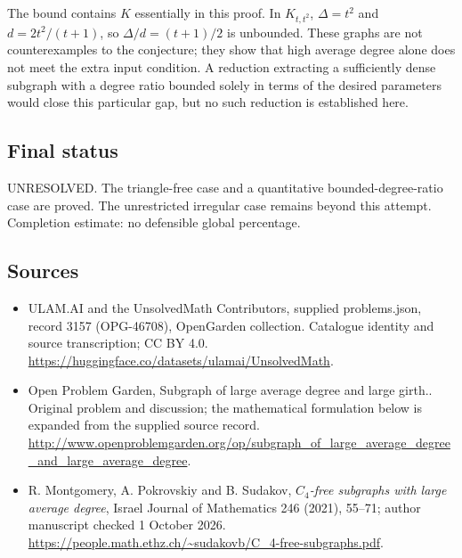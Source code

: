 \documentclass[11pt,a4paper]{article}
\begin{document}
The bound contains $K$ essentially in this proof. In $K_{t,t^2}$,
$\Delta=t^2$ and $d=2t^2/(t+1)$, so $\Delta/d=(t+1)/2$ is unbounded.
These graphs are not counterexamples to the conjecture; they show that
high average degree alone does not meet the extra input condition.
A reduction extracting a sufficiently dense subgraph with a degree
ratio bounded solely in terms of the desired parameters would close
this particular gap, but no such reduction is established here.

\subsection{Final status}
UNRESOLVED. The triangle-free case and a quantitative bounded-degree-ratio
case are proved. The unrestricted irregular case remains beyond this
attempt. Completion estimate: no defensible global percentage.

\subsection{Sources}
\begin{itemize}
\item[S1] ULAM.AI and the UnsolvedMath Contributors, supplied problems.json, record 3157 (OPG-46708), OpenGarden collection. Catalogue identity and source transcription; CC BY 4.0.
\url{https://huggingface.co/datasets/ulamai/UnsolvedMath}.
\item[S2] Open Problem Garden, Subgraph of large average degree and large girth.. Original problem and discussion; the mathematical formulation below is expanded from the supplied source record.
\url{http://www.openproblemgarden.org/op/subgraph_of_large_average_degree_and_large_average_degree}.
\item[S3] R. Montgomery, A. Pokrovskiy and B. Sudakov, \emph{$C_4$-free subgraphs with large average degree}, Israel Journal of Mathematics 246 (2021), 55--71; author manuscript checked 1 October 2026.
\url{https://people.math.ethz.ch/~sudakovb/C_4-free-subgraphs.pdf}.
\end{itemize}
\end{document}
